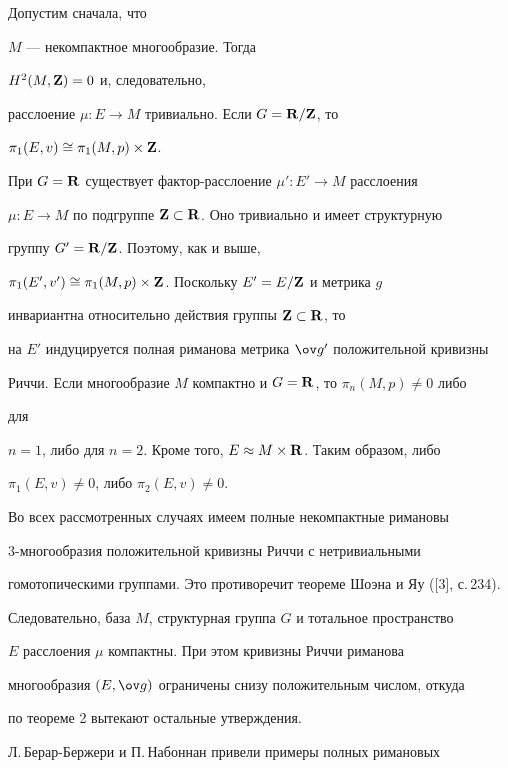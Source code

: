 \begin{pf}


Допустим сначала, что


$M$ --- некомпактное многообразие. Тогда\linebreak


$H^2(M,{\bold Z})=0$ и, следовательно,


расслоение $\mu:E\to M$ тривиально. Если $G={\bold R}/{\bold Z}$, то


$\pi_1(E,v)\cong\pi_1(M,p)\times{\bold Z}$.


При $G={\bold R}$ существует фактор-расслоение $\mu':E'\to M$ расслоения


$\mu:E\to M$ по подгруппе ${\bold Z}\subset{\bold R}$. Оно тривиально и имеет структурную


группу $G'={\bold R}/{\bold Z}$. Поэтому, как и выше,


$\pi_1(E',v')\cong\pi_1(M,p)\times{\bold Z}$. Поскольку $E'=E/{\bold Z}$ и метрика $g$


инвариантна относительно действия группы ${\bold Z}\subset{\bold R}$, то


на $E'$ индуцируется полная риманова метрика $\g'$ положительной кривизны


Риччи. Если многообразие $M$ компактно и $G={\bold R}$, то $\pi_n(M,p)\ne0$ либо


для


$n=1$, либо для $n=2$. Кроме того, $E\approx M\times{\bold R}$. Таким образом, либо


$\pi_1(E,v)\ne0$, либо $\pi_2(E,v)\ne0$.





Во всех рассмотренных случаях имеем полные некомпактные римановы


3-многообразия положительной кривизны Риччи с нетривиальными


гомотопическими группами. Это противоречит теореме Шоэна и Яу ([3], с.\,234).


Следовательно, база $M$, структурная группа $G$ и тотальное пространство


$E$ расслоения $\mu$ компактны. При этом кривизны Риччи риманова


многообразия $(E,\g)$ ограничены снизу положительным числом, откуда


по теореме 2 вытекают остальные утверждения.


\end{pf}





Л.\,Берар-Бержери и П.\,Набоннан привели примеры полных римановых



